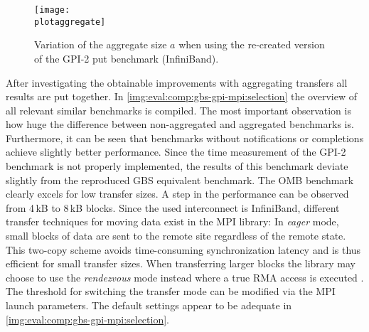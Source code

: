 \begin{figure}[htb]
\centering
\texttt{[image: \\plotaggregate]}
\caption{Variation of the aggregate size $a$ when using the re-created version of the \acs{GPI}-2 put benchmark (InfiniBand).}
\label{img:eval:comp:gbs-gpi-mpi:aggregate}
\end{figure}

After investigating the obtainable improvements with aggregating transfers all results are put together. In \autoref{img:eval:comp:gbs-gpi-mpi:selection} the overview of all relevant similar benchmarks is compiled. The most important observation is how huge the difference between non-aggregated and aggregated benchmarks is. Furthermore, it can be seen that benchmarks without notifications or completions achieve slightly better performance. Since the time measurement of the \ac{GPI}-2 benchmark is not properly implemented, the results of this benchmark deviate slightly from the reproduced \ac{GBS} equivalent benchmark. The \ac{OMB} benchmark clearly excels for low transfer sizes. A step in the performance can be observed from 4\,kB to 8\,kB blocks. Since the used interconnect is InfiniBand, different transfer techniques for moving data exist in the \ac{MPI} library: In \emph{eager} mode, small blocks of data are sent to the remote site regardless of the remote state. This two-copy scheme avoids time-consuming synchronization latency and is thus efficient for small transfer sizes. When transferring larger blocks the library may choose to use the \emph{rendezvous} mode instead where a true \ac{RMA} access is executed \cite{mpi-eager}. The threshold for switching the transfer mode can be modified via the \ac{MPI} launch parameters. The default settings appear to be adequate in \autoref{img:eval:comp:gbs-gpi-mpi:selection}.

